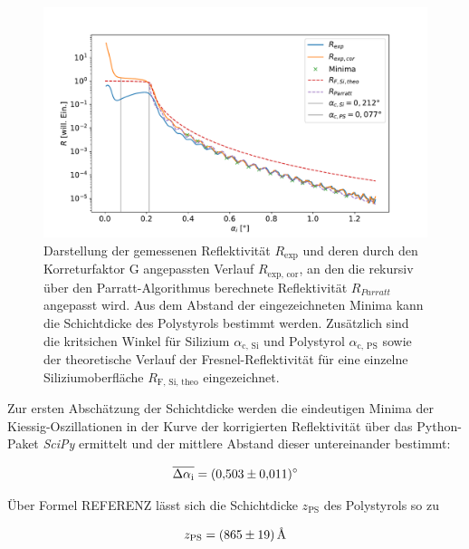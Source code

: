     \FloatBarrier
    \begin{figure}[h]
        \centering
        \includegraphics[width = \textwidth]{reflectivity_cor.pdf}
        \caption{Darstellung der gemessenen Reflektivität $R_{\text{exp}}$ und deren durch den Korreturfaktor G angepassten Verlauf $R_{\text{exp, cor}}$, an den die rekursiv über den Parratt-Algorithmus berechnete Reflektivität $R_{Parratt}$ angepasst wird. Aus dem Abstand der eingezeichneten Minima kann die Schichtdicke des Polystyrols bestimmt werden. Zusätzlich sind die kritsichen Winkel für Silizium $\alpha_{\text{c, Si}}$ und Polystyrol $\alpha_{\text{c, PS}}$ sowie der theoretische Verlauf der Fresnel-Reflektivität für eine einzelne Siliziumoberfläche $R_{\text{F, Si, theo}}$ eingezeichnet.}
        \label{fig:Reflektivität}
      \end{figure}
   
    \FloatBarrier

    Zur ersten Abschätzung der Schichtdicke werden die eindeutigen Minima der Kiessig-Oszillationen in der Kurve der korrigierten Reflektivität über das Python-Paket \textit{SciPy} ermittelt und der 
    mittlere Abstand dieser untereinander bestimmt:
    
    \begin{equation*}
      \overline{\Delta \alpha_{\text{i}}} = \SI{0.503+-0.011}{\degree}
    \end{equation*}
    
    Über Formel REFERENZ lässt sich die Schichtdicke $z_{\text{PS}}$ des Polystyrols so zu

    \begin{equation}
      z_{\text{PS}} = \SI{865+-19}{\angstrom}
      \label{eqn:z_ps}
    \end{equation}

